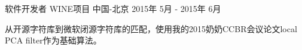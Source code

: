 \begin{cventries}

\cventry
{软件开发者} %
{WINE项目} %
{中国-北京} %
{2015年 5月 - 2015年 6月} %
{ %
\begin{cvitems}
\item {从开源字符库到微软闭源字符库的匹配，使用我的2015奶奶CCBR会议论文local PCA filter作为基础算法。}
\end{cvitems}
}


\end{cventries}
